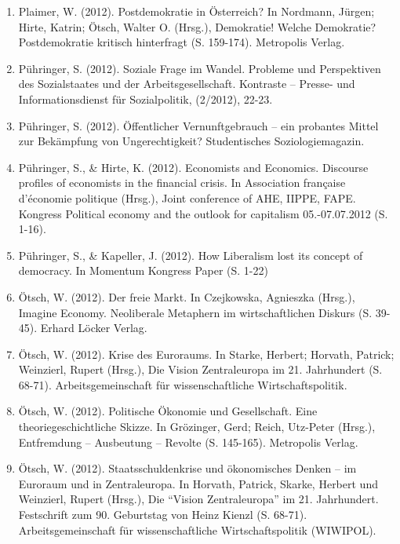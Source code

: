 \begin{enumerate}
	 \item Plaimer, W. (2012). Postdemokratie in Österreich? In Nordmann, Jürgen; Hirte, Katrin; Ötsch, Walter O. (Hrsg.), Demokratie! Welche Demokratie? Postdemokratie kritisch hinterfragt (S. 159-174). Metropolis Verlag.
	 \item Pühringer, S. (2012). Soziale Frage im Wandel. Probleme und Perspektiven des Sozialstaates und der Arbeitsgesellschaft. Kontraste -- Presse- und Informationsdienst für Sozialpolitik, (2/2012), 22-23.
	 \item Pühringer, S. (2012). Öffentlicher Vernunftgebrauch -- ein probantes Mittel zur Bekämpfung von Ungerechtigkeit? Studentisches Soziologiemagazin.
	 \item Pühringer, S., \& Hirte, K. (2012). Economists and Economics. Discourse profiles of economists in the financial crisis. In Association française d'économie politique (Hrsg.), Joint conference of AHE, IIPPE, FAPE. Kongress Political economy and the outlook for capitalism 05.-07.07.2012 (S. 1-16).
	 \item Pühringer, S., \& Kapeller, J. (2012). How Liberalism lost its concept of democracy. In Momentum Kongress Paper (S. 1-22)
	 \item Ötsch, W. (2012). Der freie Markt. In Czejkowska, Agnieszka (Hrsg.), Imagine Economy. Neoliberale Metaphern im wirtschaftlichen Diskurs (S. 39-45). Erhard Löcker Verlag.
	 \item Ötsch, W. (2012). Krise des Euroraums. In Starke, Herbert; Horvath, Patrick; Weinzierl, Rupert (Hrsg.), Die Vision Zentraleuropa im 21. Jahrhundert (S. 68-71). Arbeitsgemeinschaft für wissenschaftliche Wirtschaftspolitik.
	 \item Ötsch, W. (2012). Politische Ökonomie und Gesellschaft. Eine theoriegeschichtliche Skizze. In Grözinger, Gerd; Reich, Utz-Peter (Hrsg.), Entfremdung – Ausbeutung – Revolte (S. 145-165). Metropolis Verlag.
	 \item Ötsch, W. (2012). Staatsschuldenkrise und ökonomisches Denken – im Euroraum und in Zentraleuropa. In Horvath, Patrick, Skarke, Herbert  und Weinzierl, Rupert (Hrsg.), Die “Vision Zentraleuropa” im 21. Jahrhundert. Festschrift zum 90. Geburtstag von Heinz Kienzl (S. 68-71). Arbeitsgemeinschaft für wissenschaftliche Wirtschaftspolitik (WIWIPOL).
\end{enumerate}
